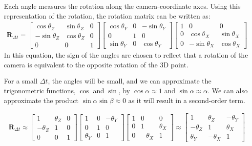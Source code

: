 Each angle measures the rotation along the camera-coordinate axes. Using this representation of the rotation, the rotation matrix can be written as:
\begin{align}
    \mathbf{R}_{\Delta t} =
    \begin{bmatrix}
        \cos \theta_Z  & \sin \theta_Z & 0 \\
        -\sin \theta_Z & \cos \theta_Z & 0 \\
        0              & 0             & 1
    \end{bmatrix}
    \begin{bmatrix}
        \cos \theta_Y & 0 & -\sin \theta_Y \\
        0             & 1 & 0              \\
        \sin \theta_Y & 0 & \cos \theta_Y
    \end{bmatrix}
    \begin{bmatrix}
        1 & 0              & 0             \\
        0 & \cos \theta_X  & \sin \theta_X \\
        0 & -\sin \theta_X & \cos \theta_X
    \end{bmatrix}
\end{align}
In this equation, the sign of the angles are chosen to reflect that a rotation of the camera is equivalent to the opposite rotation of the 3D point.

For a small $\Delta t$, the angles will be small, and we can approximate the trigonometric functions, $\cos$ and $\sin$, by $\cos \alpha \approx 1$ and $\sin \alpha \approx \alpha$. We can also approximate the product $\sin \alpha \sin \beta \approx 0$ as it will result in a second-order term.

\begin{align}
    \mathbf{R}_{\Delta t} \approx
    \begin{bmatrix}
        1         & \theta_Z & 0 \\
        -\theta_Z & 1        & 0 \\
        0         & 0        & 1
    \end{bmatrix}
    \begin{bmatrix}
        1        & 0 & -\theta_Y \\
        0        & 1 & 0         \\
        \theta_Y & 0 & 1
    \end{bmatrix}
    \begin{bmatrix}
        1 & 0         & 0        \\
        0 & 1         & \theta_X \\
        0 & -\theta_X & 1
    \end{bmatrix}
    \approx
    \begin{bmatrix}
        1         & \theta_Z  & -\theta_Y \\
        -\theta_Z & 1         & \theta_X  \\
        \theta_Y  & -\theta_X & 1
    \end{bmatrix}
\end{align}


